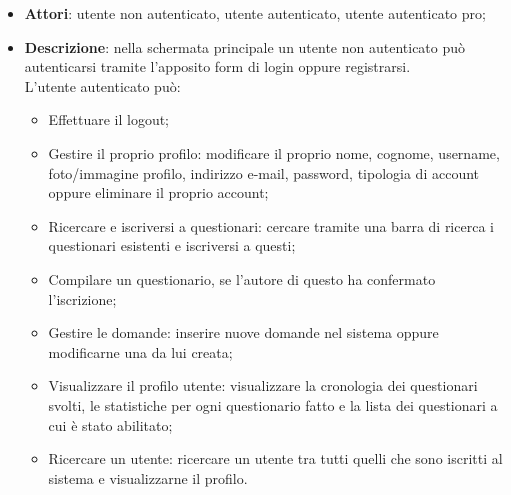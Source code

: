 \begin{itemize}
\item\textbf{Attori}: utente non autenticato, utente autenticato, utente autenticato pro;
\item\textbf{Descrizione}: nella schermata principale un utente non autenticato può autenticarsi tramite l'apposito form di login oppure registrarsi.\\
L'utente autenticato può:
\begin{itemize}
\item Effettuare il logout;
\item Gestire il proprio profilo: modificare il proprio nome, cognome, username, foto/immagine profilo, indirizzo e-mail, password, tipologia di account oppure eliminare il proprio account;
\item Ricercare e iscriversi a questionari: cercare tramite una barra di ricerca i questionari esistenti e iscriversi a questi;
\item Compilare un questionario, se l'autore di questo ha confermato l'iscrizione;
\item Gestire le domande: inserire nuove domande nel sistema oppure modificarne una da lui creata;
\item Visualizzare il profilo utente: visualizzare la cronologia dei questionari svolti, le statistiche per ogni questionario fatto e la lista dei questionari a cui è stato abilitato;
\item Ricercare un utente: ricercare un utente tra tutti quelli che sono iscritti al sistema e visualizzarne il profilo.
\end{itemize}


\end{itemize}

